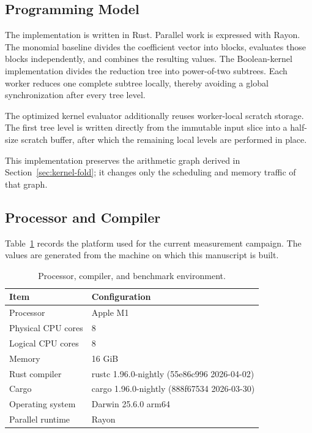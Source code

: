 \subsection{Programming Model}
\label{sec:programming-model}

The implementation is written in Rust.  Parallel work is expressed with
Rayon.  The monomial baseline divides the coefficient vector into blocks,
evaluates those blocks independently, and combines the resulting values.
The Boolean-kernel implementation divides the reduction tree into
power-of-two subtrees.  Each worker reduces one complete subtree locally,
thereby avoiding a global synchronization after every tree level.

The optimized kernel evaluator additionally reuses worker-local scratch
storage.  The first tree level is written directly from the immutable input
slice into a half-size scratch buffer, after which the remaining local
levels are performed in place.

This implementation preserves the arithmetic graph derived in
Section~\ref{sec:kernel-fold}; it changes only the scheduling and memory
traffic of that graph.

\subsection{Processor and Compiler}
\label{sec:processor-compiler}

Table~\ref{tab:platform} records the platform used for the current
measurement campaign.  The values are generated from the machine on which
this manuscript is built.

\begin{table}[ht]
\centering
\caption{Processor, compiler, and benchmark environment.}
\label{tab:platform}
\begin{tabular}{ll}
\toprule
Item & Configuration\\
\midrule
Processor & Apple M1\\
Physical CPU cores & 8\\
Logical CPU cores & 8\\
Memory & 16 GiB\\
Rust compiler & rustc 1.96.0-nightly (55e86c996 2026-04-02)\\
Cargo & cargo 1.96.0-nightly (888f67534 2026-03-30)\\
Operating system & Darwin 25.6.0 arm64\\
Parallel runtime & Rayon\\
\bottomrule
\end{tabular}
\end{table}

